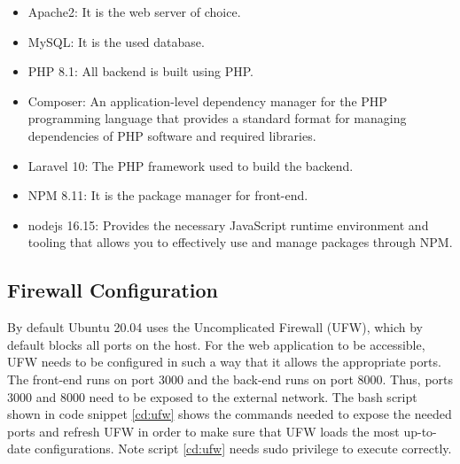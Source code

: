\begin{itemize}
    \item Apache2: It is the web server of choice.
    \item MySQL: It is the used database.
    \item PHP 8.1: All backend is built using PHP.
    \item Composer: An application-level dependency manager for the PHP programming language that provides a standard format for managing dependencies of PHP software and required libraries.
    \item Laravel 10: The PHP framework used to build the backend.
    \item NPM 8.11: It is the package manager for front-end.
    \item nodejs 16.15: Provides the necessary JavaScript runtime environment and tooling that allows you to effectively use and manage packages through NPM.
\end{itemize}

\subsection{Firewall Configuration}
By default Ubuntu 20.04 uses the Uncomplicated Firewall (UFW)\cite{ubuntu-ufw}, which by default blocks all ports on the host. For the web application to be accessible, UFW needs to be configured in such a way that it allows the appropriate ports. The front-end runs on port 3000 and the back-end runs on port 8000. Thus, ports 3000 and 8000 need to be exposed to the external network. The bash script shown in code snippet \ref{cd:ufw} shows the commands needed to expose the needed ports and refresh UFW in order to make sure that UFW loads the most up-to-date configurations. Note script \ref{cd:ufw} needs sudo privilege to execute correctly.






% 